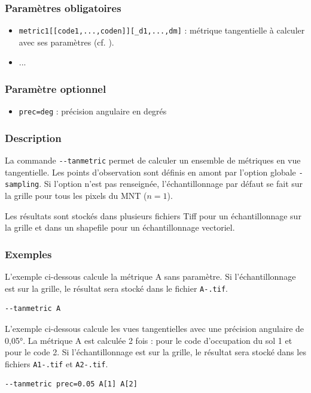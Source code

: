 \documentclass{report}
\begin{document}
\subsubsection{Paramètres obligatoires}
\begin{itemize}
	\item \verb|metric1[[code1,...,coden]][_d1,...,dm]| : métrique tangentielle à calculer avec ses paramètres (cf. ).
	\item ...
\end{itemize}

\subsubsection{Paramètre optionnel}
\begin{itemize}
	\item \verb|prec=deg| : précision angulaire en degrés
\end{itemize}

\subsubsection{Description}
La commande \verb|--tanmetric| permet de calculer un ensemble de métriques en vue tangentielle. Les points d'observation sont définis en amont par l'option globale \verb|-sampling|. Si l'option n'est pas renseignée, l'échantillonnage par défaut se fait sur la grille pour tous les pixels du MNT ($n=1$).

Les résultats sont stockés dans plusieurs fichiers Tiff pour un échantillonnage sur la grille et dans un shapefile pour un échantillonnage vectoriel.


\subsubsection{Exemples}

L'exemple ci-dessous calcule la métrique A sans paramètre. Si l'échantillonnage est sur la grille, le résultat sera stocké dans le fichier \verb|A-.tif|.
\begin{Verbatim}
--tanmetric A
\end{Verbatim}

L'exemple ci-dessous calcule les vues tangentielles avec une précision angulaire de 0,05°. La métrique A est calculée 2 fois : pour le code d'occupation du sol 1 et pour le code 2. Si l'échantillonnage est sur la grille, le résultat sera stocké dans les fichiers \verb|A1-.tif| et \verb|A2-.tif|.
\begin{Verbatim}
--tanmetric prec=0.05 A[1] A[2]
\end{Verbatim}
\end{document}
